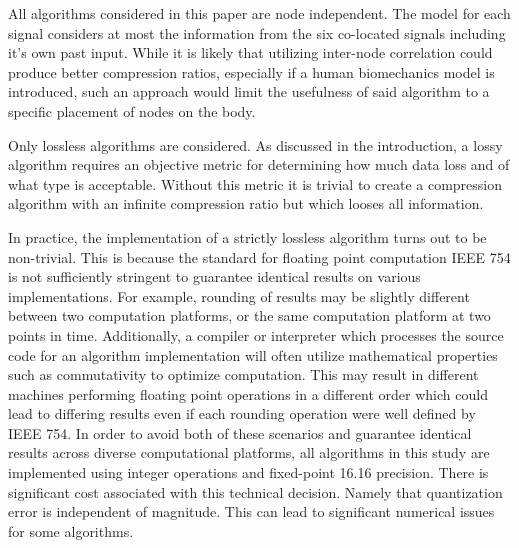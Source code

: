 \documentclass[journal]{IEEEtran}
\begin{document}
All algorithms considered in this paper are node independent. The model for each signal considers at most the information from the six co-located signals including it's own past input. While it is likely that utilizing inter-node correlation could produce better compression ratios, especially if a human biomechanics model is introduced, such an approach would limit the usefulness of said algorithm to a specific placement of nodes on the body.

Only lossless algorithms are considered. As discussed in the introduction, a lossy algorithm requires an objective metric for determining how much data loss and of what type is acceptable. Without this metric it is trivial to create a compression algorithm with an infinite compression ratio but which looses all information.

In practice, the implementation of a strictly lossless algorithm turns out to be non-trivial. This is because the standard for floating point computation IEEE 754 \cite{Society2008} is not sufficiently stringent to guarantee identical results on various implementations. For example, rounding of results may be slightly different between two computation platforms, or the same computation platform at two points in time. Additionally, a compiler or interpreter which processes the source code for an algorithm implementation will often utilize mathematical properties such as commutativity to optimize computation. This may result in different machines performing floating point operations in a different order which could lead to differing results even if each rounding operation were well defined by IEEE 754. In order to avoid both of these scenarios and guarantee identical results across diverse computational platforms, all algorithms in this study are implemented using integer operations and fixed-point 16.16 precision. There is significant cost associated with this technical decision. Namely that quantization error is independent of magnitude. This can lead to significant numerical issues for some algorithms.
\end{document}
